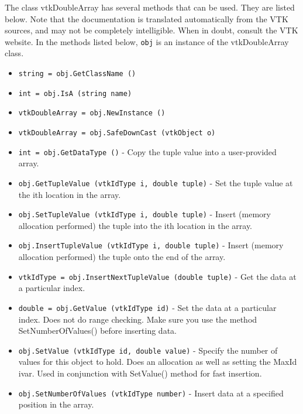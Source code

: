 The class vtkDoubleArray has several methods that can be used.
  They are listed below.
Note that the documentation is translated automatically from the VTK sources,
and may not be completely intelligible.  When in doubt, consult the VTK website.
In the methods listed below, \verb|obj| is an instance of the vtkDoubleArray class.
\begin{itemize}
\item  \verb|string = obj.GetClassName ()|

\item  \verb|int = obj.IsA (string name)|

\item  \verb|vtkDoubleArray = obj.NewInstance ()|

\item  \verb|vtkDoubleArray = obj.SafeDownCast (vtkObject o)|

\item  \verb|int = obj.GetDataType ()| -  Copy the tuple value into a user-provided array.

\item  \verb|obj.GetTupleValue (vtkIdType i, double tuple)| -  Set the tuple value at the ith location in the array.

\item  \verb|obj.SetTupleValue (vtkIdType i, double tuple)| -  Insert (memory allocation performed) the tuple into the ith location
 in the array.

\item  \verb|obj.InsertTupleValue (vtkIdType i, double tuple)| -  Insert (memory allocation performed) the tuple onto the end of the array.

\item  \verb|vtkIdType = obj.InsertNextTupleValue (double tuple)| -  Get the data at a particular index.

\item  \verb|double = obj.GetValue (vtkIdType id)| -  Set the data at a particular index. Does not do range checking. Make sure
 you use the method SetNumberOfValues() before inserting data.

\item  \verb|obj.SetValue (vtkIdType id, double value)| -  Specify the number of values for this object to hold. Does an
 allocation as well as setting the MaxId ivar. Used in conjunction with
 SetValue() method for fast insertion.

\item  \verb|obj.SetNumberOfValues (vtkIdType number)| -  Insert data at a specified position in the array.


\end{itemize}
